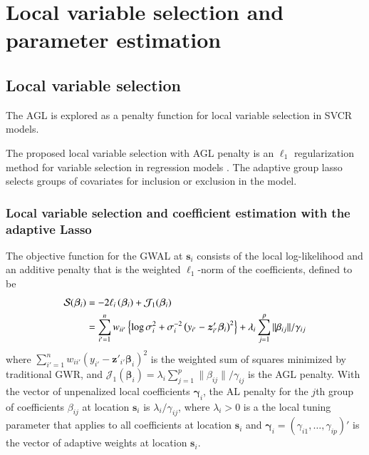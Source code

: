 \documentclass[authoryear, review, 11pt]{elsarticle}
\begin{document}
\section{Local variable selection and parameter estimation \label{section:model-selection}}
	\subsection{Local variable selection}
	The AGL is explored as a penalty function for local variable selection in SVCR models.
	
	The proposed local variable selection with AGL penalty is an $\ell_1$ regularization method for variable selection in regression models \citep{Wang-Leng-2008,Zou:2006}. The adaptive group lasso selects groups of covariates for inclusion or exclusion in the model.
	
	\subsubsection{Local variable selection and coefficient estimation with the adaptive Lasso}
	The objective function for the GWAL at $\bm{s}_i$ consists of the local log-likelihood and an additive penalty that is the weighted $\ell_1$-norm of the coefficients, defined to be
	\begin{align}\label{eq:adaptive-lasso-WLS}
		\mathcal{S}(\bm{\beta}_i) &= -2\ell_i\left(\bm{\beta}_i\right) + \mathcal{J}_1(\bm{\beta}_i) \notag \\
		&= \sum_{i'=1}^n w_{ii'}  \left\{ \log{\sigma^2_i}  + \sigma^{-2}_i  \left(y_{i'} - \bm{z}'_{i'} \bm{\beta}_i \right)^2 \right\} +  \lambda_i \sum_{j=1}^p \|\beta_{ij}\| / \gamma_{ij}
	\end{align}
	where $\sum_{i'=1}^n w_{ii'} \left(y_{i'} - \bm{z}'_{i'} \bm{\beta}_i \right)^2$ is the weighted sum of squares minimized by traditional GWR, and $\mathcal{J}_1(\bm{\beta}_i) = \lambda_i \sum_{j=1}^p \|\beta_{ij}\| / \gamma_{ij}$ is the AGL penalty. With the vector of unpenalized local coefficients $\bm{\gamma}_i$, the AL penalty for the $j$th group of coefficients $\beta_{ij}$ at location $\bm{s}_i$ is $\lambda_i / \gamma_{ij}$, where $\lambda_i > 0$ is a the local tuning parameter that applies to all coefficients at location $\bm{s}_i$ and $\bm{\gamma}_i = \left(\gamma_{i1}, \dots, \gamma_{ip}\right)'$ is the vector of adaptive weights at location $\bm{s}_i$.
\end{document}
